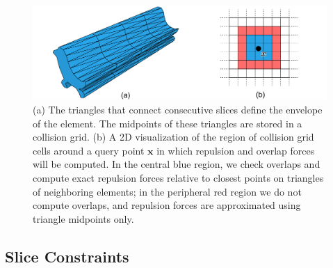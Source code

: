\begin{figure}
\centering
\includegraphics[width=1.0\textwidth]{figures/animationpak/collision_grid.pdf} 
\caption[An envelope and a collision grid]
{\label{fig_animationpak_collision_grid} 
(a) The triangles that connect consecutive slices define the envelope of the
element.  The midpoints of these triangles are stored in a collision grid.
(b) A 2D visualization of the region of collision
grid cells around a query point 
$\bm{x}$ 
in which repulsion and overlap forces will be computed.  In the central blue
region, we check overlaps and compute exact repulsion forces relative to
closest points on triangles of neighboring elements; in the peripheral
red region we do not compute overlaps, and repulsion forces are approximated
using triangle midpoints only.}
\end{figure}


\subsection{Slice Constraints}
\label{animationpak_slice_constraints}

